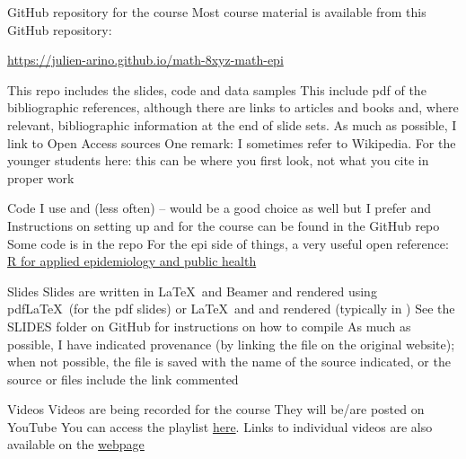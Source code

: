 \documentclass[aspectratio=169]{beamer}\usepackage[]{graphicx}\usepackage[]{xcolor}
\begin{document}
\begin{frame}{GitHub repository for the course}
Most course material is available from this GitHub repository:
\begin{center}
	\href{https://julien-arino.github.io/math-8xyz-math-epi}{https://julien-arino.github.io/math-8xyz-math-epi}
\end{center}
\vfill
This repo includes the slides, code and data samples
\vfill
This  include pdf of the bibliographic references, although there are links to articles and books and, where relevant, bibliographic information at the end of slide sets. As much as possible, I link to Open Access sources
\vfill
One remark: I sometimes refer to Wikipedia. For the younger students here: this can be where you first look, not what you cite in proper work
\end{frame} 

\begin{frame}{Code}
    I use  and (less often)  -- would be a good choice as well but I prefer  and 
    \vfill
    Instructions on setting up  and  for the course can be found in the GitHub repo
    \vfill
    Some code is in the repo
    \vfill
    For the epi side of things, a very useful open reference: \href{https://epirhandbook.com/en/index.html}{R for applied epidemiology and public health}
\end{frame} 
    
    
\begin{frame}{Slides}
Slides are written in \LaTeX\ and Beamer and rendered using pdf\LaTeX\ (for the pdf slides) or \LaTeX\ and  and rendered  (typically in )
\vfill
See the SLIDES folder on GitHub for instructions on how to compile
\vfill
As much as possible, I have indicated provenance (by linking the file on the original website); when not possible, the file is saved with the name of the source indicated, or the source  or  files include the link commented
\end{frame} 

\begin{frame}{Videos}
Videos are being recorded for the course
\vfill
They will be/are posted on YouTube
\vfill
You can access the playlist \href{https://youtube.com/playlist?list=PLfRaznSpWo2sHwiQ04IT5STYdwarcMtRA}{here}. Links to individual videos are also available on the \href{https://julien-arino.github.io/3MC-course-epidemiological-modelling/}{webpage}
\end{frame} 
\end{document}
